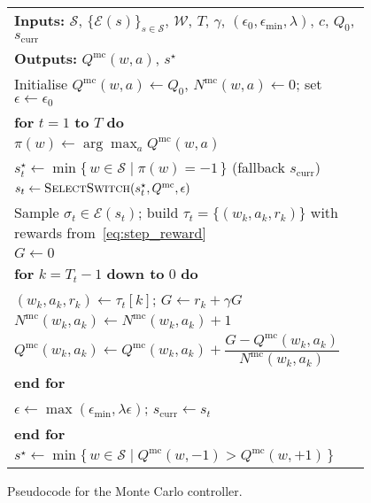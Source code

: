 \documentclass[journal]{IEEEtranTIE}
\begin{document}
\begin{figure}[t]
  \centering
  \begingroup\footnotesize
  \begin{tabular}{p{0.95\linewidth}}
    \toprule
    \textbf{Inputs:} $\mathcal{S}$, $\{\mathcal{E}(s)\}_{s\in\mathcal{S}}$, $\mathcal{W}$, $T$, $\gamma$, $(\epsilon_0,\epsilon_{\min},\lambda)$, $c$, $Q_0$, $s_{\mathrm{curr}}$ \\
    \textbf{Outputs:} $Q^{\mathrm{mc}}(w,a)$, $s^\star$ \\
    \midrule
    Initialise $Q^{\mathrm{mc}}(w,a)\leftarrow Q_0$, $N^{\mathrm{mc}}(w,a)\leftarrow 0$; set $\epsilon\leftarrow\epsilon_0$ \\
    \textbf{for} $t=1$ \textbf{to} $T$ \textbf{do} \\
    \quad $\pi(w) \leftarrow \arg\max_{a} Q^{\mathrm{mc}}(w,a)$ \\
    \quad $s^\star_t \leftarrow \min\{\,w\in\mathcal{S}\mid \pi(w)=-1\,\}$ (fallback $s_{\mathrm{curr}}$) \\
    \quad $s_t \leftarrow \textsc{SelectSwitch}(s^\star_t, Q^{\mathrm{mc}}, \epsilon)$ \\
    \quad Sample $\sigma_t \in \mathcal{E}(s_t)$; build $\tau_t=\{(w_k,a_k,r_k)\}$ with rewards from~\eqref{eq:step_reward} \\
    \quad $G \leftarrow 0$ \\
    \quad \textbf{for} $k = T_t-1$ \textbf{down to} $0$ \textbf{do} \\
    \qquad $(w_k,a_k,r_k) \leftarrow \tau_t[k]$; $G \leftarrow r_k + \gamma G$ \\
    \qquad $N^{\mathrm{mc}}(w_k,a_k) \leftarrow N^{\mathrm{mc}}(w_k,a_k)+1$ \\
    \qquad $Q^{\mathrm{mc}}(w_k,a_k) \leftarrow Q^{\mathrm{mc}}(w_k,a_k) + \dfrac{G - Q^{\mathrm{mc}}(w_k,a_k)}{N^{\mathrm{mc}}(w_k,a_k)}$ \\
    \quad \textbf{end for} \\
    \quad $\epsilon \leftarrow \max(\epsilon_{\min}, \lambda \epsilon)$; $s_{\mathrm{curr}} \leftarrow s_t$ \\
    \textbf{end for} \\
    $s^\star \leftarrow \min\{\,w\in\mathcal{S}\mid Q^{\mathrm{mc}}(w,-1) > Q^{\mathrm{mc}}(w,+1)\,\}$ \\
    \bottomrule
  \end{tabular}
  \endgroup
  \caption{Pseudocode for the Monte Carlo controller.}
  \label{fig:mc-pseudocode}
\end{figure}
\end{document}
